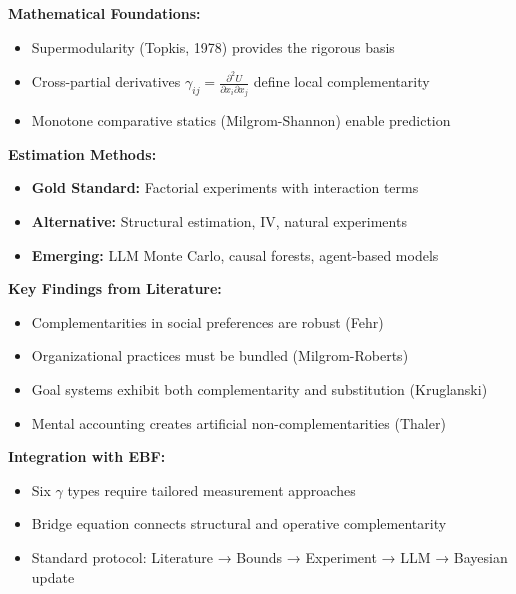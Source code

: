 \begin{tcolorbox}[colback=gray!5!white,colframe=gray!75!black,title=\textbf{Summary: Complementarity Measurement Methodology}]

\textbf{Mathematical Foundations:}
\begin{itemize}[noitemsep]
    \item Supermodularity (Topkis, 1978) provides the rigorous basis
    \item Cross-partial derivatives $\gamma_{ij} = \frac{\partial^2 U}{\partial x_i \partial x_j}$ define local complementarity
    \item Monotone comparative statics (Milgrom-Shannon) enable prediction
\end{itemize}

\textbf{Estimation Methods:}
\begin{itemize}[noitemsep]
    \item \textbf{Gold Standard:} Factorial experiments with interaction terms
    \item \textbf{Alternative:} Structural estimation, IV, natural experiments
    \item \textbf{Emerging:} LLM Monte Carlo, causal forests, agent-based models
\end{itemize}

\textbf{Key Findings from Literature:}
\begin{itemize}[noitemsep]
    \item Complementarities in social preferences are robust (Fehr)
    \item Organizational practices must be bundled (Milgrom-Roberts)
    \item Goal systems exhibit both complementarity and substitution (Kruglanski)
    \item Mental accounting creates artificial non-complementarities (Thaler)
\end{itemize}

\textbf{Integration with EBF:}
\begin{itemize}[noitemsep]
    \item Six $\gamma$ types require tailored measurement approaches
    \item Bridge equation connects structural and operative complementarity
    \item Standard protocol: Literature → Bounds → Experiment → LLM → Bayesian update
\end{itemize}

\end{tcolorbox}

